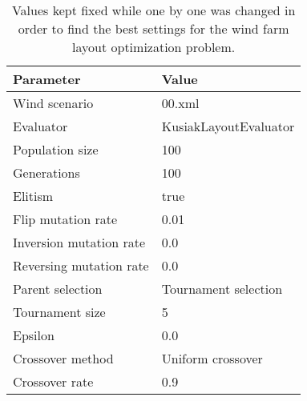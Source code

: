 \begin{table}
\centering
\caption{Values kept fixed while one by one was changed in order to find the best settings for the wind farm layout optimization problem.}
\label{table:fixed settings}
\begin{tabular}{l|l}
\textbf{Parameter} & \textbf{Value} \\ 
\hline 
Wind scenario & 00.xml \\ 
Evaluator & KusiakLayoutEvaluator \\ 
Population size & 100 \\  
Generations & 100 \\ 
Elitism & true \\  
Flip mutation rate & 0.01 \\ 
Inversion mutation rate & 0.0 \\ 
Reversing mutation rate & 0.0 \\ 
Parent selection & Tournament selection \\ 
Tournament size & 5 \\ 
Epsilon & 0.0 \\  
Crossover method & Uniform crossover \\ 
Crossover rate & 0.9 \\ 
\end{tabular} 
\end{table}


